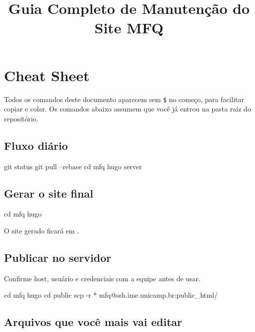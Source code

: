 \documentclass[11pt,a4paper]{article}
\title{Guia Completo de Manutenção do Site MFQ}
\author{}
\begin{document}
\maketitle

\section*{Cheat Sheet}

Todos os comandos deste documento aparecem sem \texttt{\$} no começo, para facilitar copiar e colar.
Os comandos abaixo assumem que você já entrou na pasta raiz do repositório.

\subsection*{Fluxo diário}

\begin{terminal}
git status
git pull --rebase
cd mfq
hugo server
\end{terminal}

\subsection*{Gerar o site final}

\begin{terminal}
cd mfq
hugo
\end{terminal}

O site gerado ficará em .

\subsection*{Publicar no servidor}

Confirme host, usuário e credenciais com a equipe antes de usar.

\begin{terminal}
cd mfq
hugo
cd public
scp -r * mfq@ssh.ime.unicamp.br:public_html/
\end{terminal}

\subsection*{Arquivos que você mais vai editar}
\end{document}
